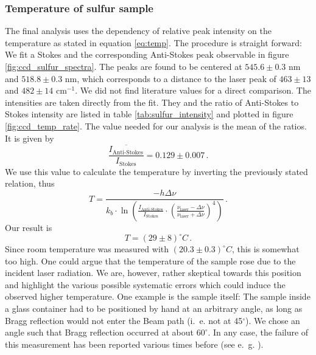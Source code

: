 \subsubsection{Temperature of sulfur sample}
The final analysis uses the dependency of relative peak intensity on the temperature as stated
in equation \eqref{eq:temp}. The procedure is straight forward: We fit a Stokes and the 
corresponding Anti-Stokes peak observable in figure \ref{fig:ccd_sulfur_spectra}. 
The peaks are found to be centered at $545.6 \pm 0.3$ nm 
and $518.8 \pm 0.3$ nm, which corresponds to a distance to the laser peak of $463 \pm 13$ and 
$482 \pm 14$ cm$^{-1}$. We did not find literature values for a direct comparison. 
The intensities are taken directly from the fit. They and the ratio of Anti-Stokes to Stokes
intensity are listed in table \ref{tab:sulfur_intensity} and plotted in figure 
\ref{fig:ccd_temp_rate}. The value needed for our analysis 
is the mean of the ratios. It is given by 
\begin{equation*}
    \overline{\frac{I_\text{Anti-Stokes}}{I_\text{Stokes}}} = 0.129 \pm 0.007 \, .
\end{equation*}
We use this value to calculate the temperature by inverting the previously stated relation, 
thus 
\begin{equation}
    T = \frac{-h \Delta \nu}{
        k_b \cdot \ln \left(
            \frac{I_\text{Anti-Stokes}}{I_\text{Stokes}} \cdot \left(\frac{\nu_\text{laser} - 
            \Delta \nu}{\nu_\text{laser} + \Delta \nu}\right)^4 
    \right)} \, .
\end{equation}
Our result is 
\begin{equation}
    T = (29 \pm 8) ^\circ C \, .
\end{equation}
Since room temperature was measured with $(20.3 \pm 0.3) ^\circ C$, this is somewhat too high. 
One could argue that the temperature of the sample rose due to the incident laser radiation. 
We are, however, rather skeptical towards this position and highlight the various possible 
systematic errors which could induce the observed higher temperature. 
One example is the sample itself: The sample inside a glass container had to be positioned 
by hand at an arbitrary angle, as long as Bragg reflection would not enter the Beam path 
(i.~e. not at 45$^\circ$). We chose an angle such that Bragg reflection occurred at about 
$60^\circ$. In any case, the failure of this 
measurement has been reported various times before (see e.~g. \cite{wiss}). 


